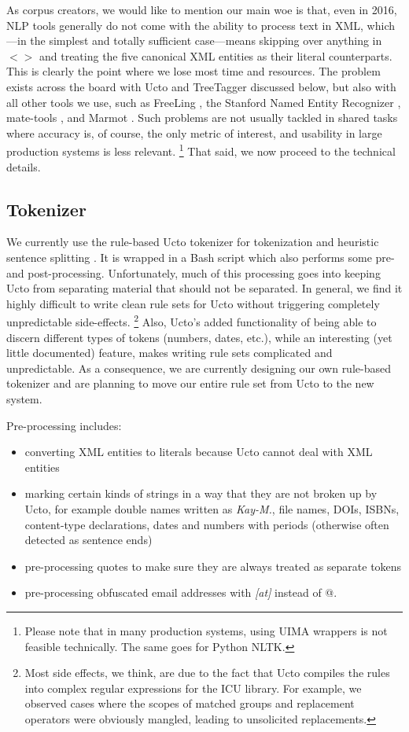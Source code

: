 \documentclass[11pt]{article}
\newcommand{\Lf}{
  \setlength{\itemsep}{1pt}
  \setlength{\parskip}{0pt}
  \setlength{\parsep}{0pt}
}
\begin{document}
As corpus creators, we would like to mention our main woe is that, even in 2016, NLP tools generally do not come with the ability to process text in XML, which---in the simplest and totally sufficient case---means skipping over anything in $<>$ and treating the five canonical XML entities as their literal counterparts.
This is clearly the point where we lose most time and resources.
The problem exists across the board with Ucto and TreeTagger discussed below, but also with all other tools we use, such as FreeLing \cite{CarrerasEa2004}, the Stanford Named Entity Recognizer \cite{FaruquiPado2010}, mate-tools \cite{BohnetNivre2012}, and Marmot \cite{MuellerEa2013}.
Such problems are not usually tackled in shared tasks where accuracy is, of course, the only metric of interest, and usability in large production systems is less relevant.%
\footnote{Please note that in many production systems, using UIMA wrappers is not feasible technically.
The same goes for Python NLTK.}
That said, we now proceed to the technical details.

\subsection{Tokenizer}
\label{sec:tokenizer}

We currently use the rule-based Ucto tokenizer for tokenization and heuristic sentence splitting \cite{ucto}.
It is wrapped in a Bash script which also performs some pre- and post-processing.
Unfortunately, much of this processing goes into keeping Ucto from separating material that should not be separated.
In general, we find it highly difficult to write clean rule sets for Ucto without triggering completely unpredictable side-effects.%
\footnote{Most side effects, we think, are due to the fact that Ucto compiles the rules into complex regular expressions for the ICU library.
For example, we observed cases where the scopes of matched groups and replacement operators were obviously mangled, leading to unsolicited replacements.}
Also, Ucto's added functionality of being able to discern different types of tokens (numbers, dates, etc.), while an interesting (yet little documented) feature, makes writing rule sets complicated and unpredictable.
As a consequence, we are currently designing our own rule-based tokenizer and are planning to move our entire rule set from Ucto to the new system.

Pre-processing includes:

\begin{itemize}\Lf
  \item converting XML entities to literals because Ucto cannot deal with XML entities
  \item marking certain kinds of strings in a way that they are not broken up by Ucto, for example double names written as \textit{Kay-M.}, file names, DOIs, ISBNs, content-type declarations, dates and numbers with periods (otherwise often detected as sentence ends)
  \item pre-processing quotes to make sure they are always treated as separate tokens
  \item pre-processing obfuscated email addresses with \textit{[at]} instead of @.
\end{itemize}
\end{document}
